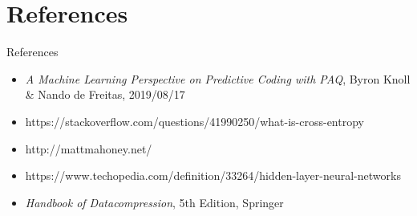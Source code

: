 \documentclass[11pt,usenames,dvipsnames]{beamer}
\begin{document}
\section{References}

\begin{frame}{References}

\begin{itemize}
	\item \textit{A Machine Learning Perspective on Predictive Coding with PAQ}, Byron Knoll \& Nando de Freitas,
	2019/08/17
	\item https://stackoverflow.com/questions/41990250/what-is-cross-entropy
	\item http://mattmahoney.net/
	\item https://www.techopedia.com/definition/33264/hidden-layer-neural-networks
	\item \textit{Handbook of Datacompression}, 5th Edition, Springer
\end{itemize}

\end{frame}
\end{document}
